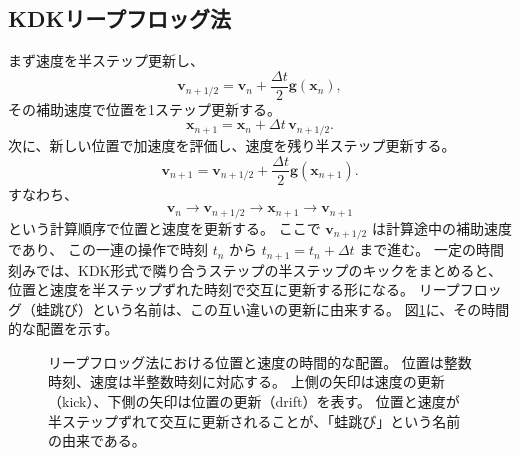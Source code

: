 \subsection{KDKリープフロッグ法}
まず速度を半ステップ更新し、
\begin{equation}
 \boldsymbol{v}_{n+1/2}=\boldsymbol{v}_n+\frac{\Delta t}{2}\boldsymbol{g}(\boldsymbol{x}_n),
\label{eq:ch3-kick1}
\end{equation}
その補助速度で位置を1ステップ更新する。
\begin{equation}
 \boldsymbol{x}_{n+1}=\boldsymbol{x}_n+\Delta t\,\boldsymbol{v}_{n+1/2}.
\label{eq:ch3-drift}
\end{equation}
次に、新しい位置で加速度を評価し、速度を残り半ステップ更新する。
\begin{equation}
 \boldsymbol{v}_{n+1}=\boldsymbol{v}_{n+1/2}+\frac{\Delta t}{2}\boldsymbol{g}(\boldsymbol{x}_{n+1}).
\label{eq:ch3-kick2}
\end{equation}
すなわち、
\begin{equation}
 \boldsymbol{v}_n\rightarrow\boldsymbol{v}_{n+1/2}\rightarrow\boldsymbol{x}_{n+1}\rightarrow\boldsymbol{v}_{n+1}
\label{eq:ch3-leapfrog-flow}
\end{equation}
という計算順序で位置と速度を更新する。
ここで $\boldsymbol{v}_{n+1/2}$ は計算途中の補助速度であり、
この一連の操作で時刻 $t_n$ から $t_{n+1}=t_n+\Delta t$ まで進む。
一定の時間刻みでは、KDK形式で隣り合うステップの半ステップのキックをまとめると、
位置と速度を半ステップずれた時刻で交互に更新する形になる。
リープフロッグ（蛙跳び）という名前は、この互い違いの更新に由来する。
図\ref{fig:ch3-kdk}に、その時間的な配置を示す。
\begin{figure}[!htbp]
\centering
{}
\caption{リープフロッグ法における位置と速度の時間的な配置。
位置は整数時刻、速度は半整数時刻に対応する。
上側の矢印は速度の更新（kick）、下側の矢印は位置の更新（drift）を表す。
位置と速度が半ステップずれて交互に更新されることが、「蛙跳び」という名前の由来である。}
\label{fig:ch3-kdk}
\end{figure}

